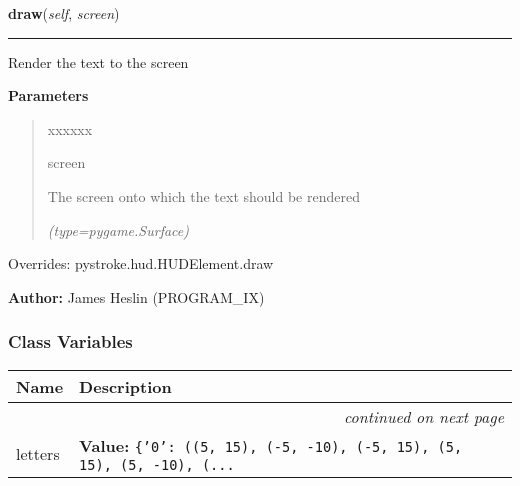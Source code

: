     \vspace{0.5ex}

\hspace{.8\funcindent}\begin{boxedminipage}{\funcwidth}

    \raggedright \textbf{draw}(\textit{self}, \textit{screen})

    \vspace{-1.5ex}

    \rule{\textwidth}{0.5\fboxrule}
\setlength{\parskip}{2ex}
    Render the text to the screen

\setlength{\parskip}{1ex}
      \textbf{Parameters}
      \vspace{-1ex}

      \begin{quote}
        \begin{Ventry}{xxxxxx}

          \item[screen]

          The screen onto which the text should be rendered

            {\it (type=pygame.Surface)}

        \end{Ventry}

      \end{quote}

      Overrides: pystroke.hud.HUDElement.draw

\textbf{Author:} James Heslin (PROGRAM\_IX)



    \end{boxedminipage}



  \subsubsection{Class Variables}

    \vspace{-1cm}
\hspace{\varindent}\begin{longtable}{|p{\varnamewidth}|p{\vardescrwidth}|l}
\cline{1-2}
\cline{1-2} \centering \textbf{Name} & \centering \textbf{Description}& \\
\cline{1-2}
\endhead\cline{1-2}\multicolumn{3}{r}{\small\textit{continued on next page}}\\\endfoot\cline{1-2}
\endlastfoot\raggedright l\-e\-t\-t\-e\-r\-s\- & \raggedright \textbf{Value:} 
{\tt \texttt{\{}\texttt{'}\texttt{0}\texttt{'}\texttt{: }\texttt{(}\texttt{(}5\texttt{, }15\texttt{)}\texttt{, }\texttt{(}-5\texttt{, }-10\texttt{)}\texttt{, }\texttt{(}-5\texttt{, }15\texttt{)}\texttt{, }\texttt{(}5\texttt{, }15\texttt{)}\texttt{, }\texttt{(}5\texttt{, }-10\texttt{)}\texttt{, }\texttt{(}\texttt{...}}&\\
\cline{1-2}
\end{longtable}

